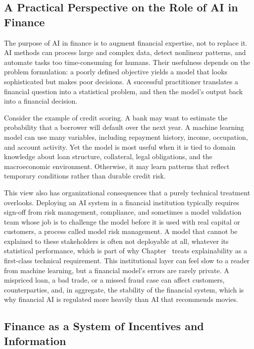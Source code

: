 \documentclass[../ai_in_finance]{subfiles}
\begin{document}
\subsection{A Practical Perspective on the Role of AI in Finance}

The purpose of AI in finance is to augment financial expertise, not to replace it. AI methods can process large and complex data, detect nonlinear patterns, and automate tasks too time-consuming for humans. Their usefulness depends on the problem formulation: a poorly defined objective yields a model that looks sophisticated but makes poor decisions. A successful practitioner translates a financial question into a statistical problem, and then the model's output back into a financial decision.

Consider the example of credit scoring. A bank may want to estimate the probability that a borrower will default over the next year. A machine learning model can use many variables, including repayment history, income, occupation, and account activity. Yet the model is most useful when it is tied to domain knowledge about loan structure, collateral, legal obligations, and the macroeconomic environment. Otherwise, it may learn patterns that reflect temporary conditions rather than durable credit risk.

This view also has organizational consequences that a purely technical treatment overlooks. Deploying an AI system in a financial institution typically requires sign-off from risk management, compliance, and sometimes a model validation team whose job is to challenge the model before it is used with real capital or customers, a process called model risk management. A model that cannot be explained to these stakeholders is often not deployable at all, whatever its statistical performance, which is part of why Chapter~ treats explainability as a first-class technical requirement.
This institutional layer can feel slow to a reader from machine learning, but a financial model's errors are rarely private. A mispriced loan, a bad trade, or a missed fraud case can affect customers, counterparties, and, in aggregate, the stability of the financial system, which is why financial AI is regulated more heavily than AI that recommends movies.

\subsection{Finance as a System of Incentives and Information}
\end{document}
